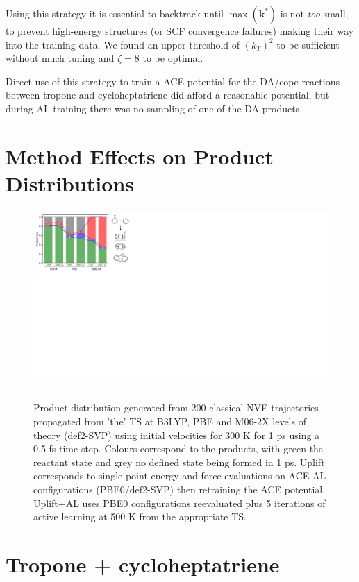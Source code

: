 \documentclass[11pt]{article}
\numberwithin{equation}{subsection}
\begin{document}
Using this strategy it is essential to backtrack until $\max(\boldsymbol{k}^*)$ is not \emph{too} small, to prevent high-energy structures (or SCF convergence failures) making their way into the training data. We found an upper threshold of $(k_T)^2$ to be sufficient without much tuning and $\zeta = 8$ to be optimal.


Direct use of this strategy to train a ACE potential for the DA/cope reactions between tropone and cycloheptatriene did afford a reasonable potential, but during AL training there was no sampling of one of the DA products.


\newpage
\section{Method Effects on Product Distributions}  \label{section::SI_method_effects_R3}


\begin{figure}[h!]
	\centering
	\vspace{0.4cm}
	\includegraphics[height=6.4cm]{figSX31.pdf}
	\vspace{0.1cm}
	\hrule
	\vspace{0.1cm}
	\caption{Product distribution generated from 200 classical NVE trajectories propagated from 'the' TS at B3LYP, PBE and M06-2X levels of theory (def2-SVP) using initial velocities for 300 K for 1 ps using a 0.5 fs time step. Colours correspond to the products, with green the reactant state and grey no defined state being formed in 1 ps. Uplift corresponds to single point energy and force evaluations on ACE AL configurations (PBE0/def2-SVP) then retraining the ACE potential. Uplift+AL uses PBE0 configurations reevaluated plus 5 iterations of active learning at 500 K from the appropriate TS.
}
	\label{fig::SX31}
\end{figure}

\clearpage
\section{Tropone + cycloheptatriene} \label{section::SI_accuracy_R3}
\end{document}
